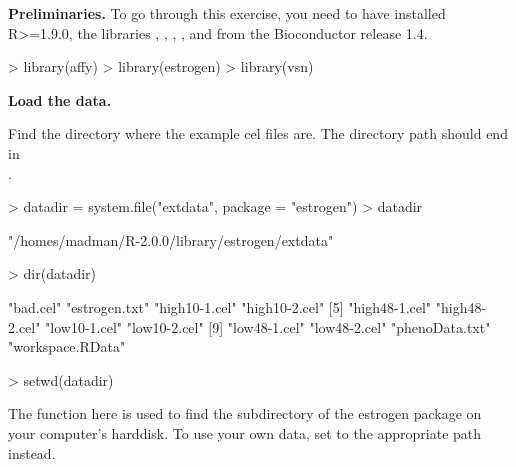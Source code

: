 \documentclass[a4paper]{article}
\begin{document}


\begin{exercises}
\item {\bf Preliminaries.}  
To go through this exercise, you need to have installed R>=1.9.0, the
libraries , , ,
, and  from the Bioconductor release 1.4.


\begin{Schunk}
\begin{Sinput}
> library(affy)
> library(estrogen)
> library(vsn)
\end{Sinput}
\end{Schunk}

\item {\bf Load the data.}  
\begin{exercise}
\item Find the directory where the example cel files are. The directory path
should end in\\
. 
\begin{Schunk}
\begin{Sinput}
> datadir = system.file("extdata", package = "estrogen")
> datadir
\end{Sinput}
\begin{Soutput}
[1] "/homes/madman/R-2.0.0/library/estrogen/extdata"
\end{Soutput}
\begin{Sinput}
> dir(datadir)
\end{Sinput}
\begin{Soutput}
 [1] "bad.cel"         "estrogen.txt"    "high10-1.cel"    "high10-2.cel"   
 [5] "high48-1.cel"    "high48-2.cel"    "low10-1.cel"     "low10-2.cel"    
 [9] "low48-1.cel"     "low48-2.cel"     "phenoData.txt"   "workspace.RData"
\end{Soutput}
\begin{Sinput}
> setwd(datadir)
\end{Sinput}
\end{Schunk}

The function  here is used to find the subdirectory
 of the estrogen package on your computer's harddisk.  To use
your own data, set  to the appropriate path instead.


\end{exercise}
\end{exercises}
\end{document}

